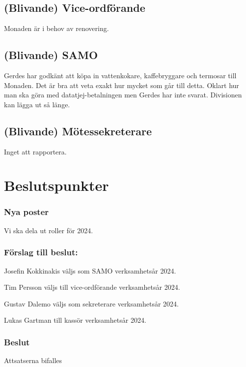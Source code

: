 \documentclass[protokoll]{dvd}
\begin{document}
\subsection{(Blivande) Vice-ordförande}
Monaden är i behov av renovering.

\subsection{(Blivande) SAMO}
Gerdes har godkänt att köpa in vattenkokare, kaffebryggare och termosar till Monaden.
Det är bra att veta exakt hur mycket som går till detta.
Oklart hur man ska göra med datatjej-betalningen men Gerdes har inte svarat. Divisionen kan lägga ut så länge.

\subsection{(Blivande) Mötessekreterare}
Inget att rapportera.

\newpage

\section{Beslutspunkter}

\subsubsection*{Nya poster}
Vi ska dela ut roller för 2024.
\subsubsection*{Förslag till beslut:}
\begin{attsatser}
    \item Josefin Kokkinakis väljs som SAMO verksamhetsår 2024.
    \item Tim Persson väljs till vice-ordförande verksamhetsår 2024.
    \item Gustav Dalemo väljs som sekreterare verksamhetsår 2024.
    \item Lukas Gartman till kassör verksamhetsår 2024.
\end{attsatser}

\subsubsection*{Beslut}
\begin{attsatser}
    \item Attsatserna bifalles
\end{attsatser}
\end{document}
